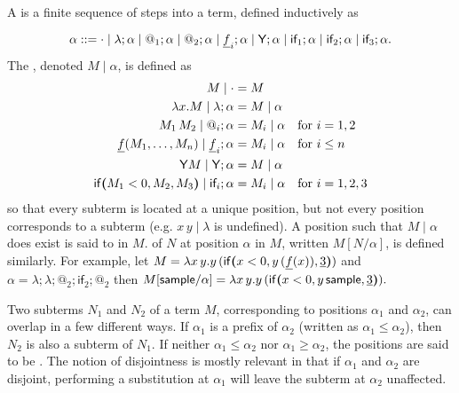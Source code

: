 A  is a finite sequence of steps into a term, defined inductively as
\iffalse
\begin{align*}
\alpha ::= & \; {\cdot} \mid \lambda ; \alpha \mid @_1 ; \alpha \mid @_2 ; \alpha \mid \underline f_i ; \alpha \\
& {} \mid \tY ; \alpha \mid \textsf{if}_1 ; \alpha \mid \textsf{if}_2 ; \alpha \mid \textsf{if}_3 ; \alpha.
\end{align*}
\fi
\[
\alpha ::= {\cdot} \mid \lambda ; \alpha \mid @_1 ; \alpha \mid @_2 ; \alpha \mid \underline f_i ; \alpha \mid \mathsf{Y} ; \alpha \mid \textsf{if}_1 ; \alpha \mid \textsf{if}_2 ; \alpha \mid \textsf{if}_3 ; \alpha.
\]
The , denoted $M \mid \alpha$, is defined as
\begin{align*}
M \mid \cdot & = M \\
\lambda x. M \mid \lambda ; \alpha & = M \mid \alpha \\
M_1 \, M_2 \mid @_i ; \alpha & = M_i \mid \alpha \quad \text{for } i = 1,2 \\
\underline f(M_1,\dots,M_n) \mid \underline f_i ; \alpha & = M_i \mid \alpha \quad \text{for }i \leq n \\
\mathsf{Y} M \mid \mathsf{Y} ; \alpha & = M \mid \alpha \\
\mathsf{if}\boldsymbol{(}M_1 < 0, M_2, M_3\boldsymbol{)} \mid \textsf{if}_i ; \alpha & = M_i \mid \alpha \quad \text{for } i = 1,2,3
\end{align*}
so that every subterm is located at a unique position, but not every position corresponds to a subterm (e.g. $x \, y \mid \lambda$ is undefined). 
A position such that $M\mid \alpha$ does exist is said to  in $M$. 
 of $N$ at position $\alpha$ in $M$, written $M[N/\alpha]$, is defined similarly.
For example, let 
\(
M = \lambda x \, y. y \, (\mathsf{if}\boldsymbol{(}x < 0, y \, (\underline f (x)), \underline 3\boldsymbol{)})
\)
and
\(
\alpha =\lambda ; \lambda ; @_2 ; \textsf{if}_2 ; @_2
\)
then 
\(
M[\mathsf{sample} / \alpha] = \lambda x \, y. y \, (\mathsf{if}\boldsymbol{(}x < 0, y \, \mathsf{sample}, \underline 3\boldsymbol{)}).
\)

Two subterms $N_1$ and $N_2$ of a term $M$, corresponding to positions $\alpha_1$ and $\alpha_2$, can overlap in a few different ways. 
If $\alpha_1$ is a prefix of $\alpha_2$ (written as $\alpha_1 \leq \alpha_2$), then $N_2$ is also a subterm of $N_1$. If neither $\alpha_1 \leq \alpha_2$ nor $\alpha_1 \geq \alpha_2$, the positions are said to be . 
The notion of disjointness is mostly relevant in that if $\alpha_1$ and $\alpha_2$ are disjoint, performing a substitution at $\alpha_1$ will leave the subterm at $\alpha_2$ unaffected.

